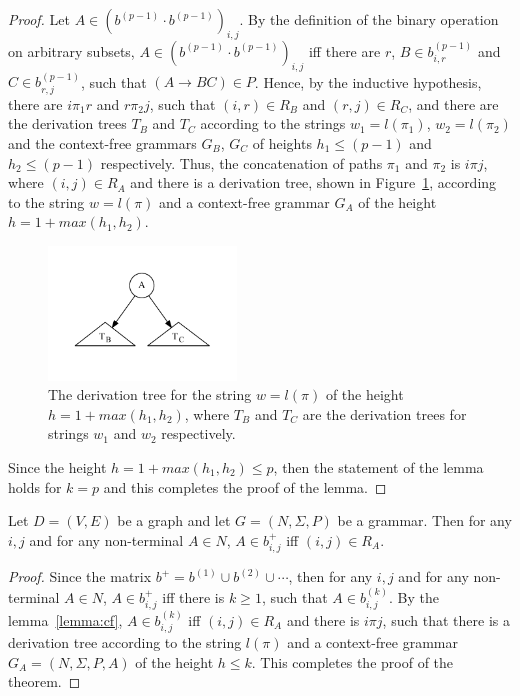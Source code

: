 \begin{proof}
Let $A \in (b^{(p-1)} \cdot b^{(p-1)})_{i,j}$. By the definition of the binary operation on arbitrary subsets, $A \in (b^{(p-1)} \cdot b^{(p-1)})_{i,j}$ iff there are $r$, $B \in b^{(p-1)}_{i,r}$ and $C \in b^{(p-1)}_{r,j}$, such that $(A \rightarrow B C) \in P$. Hence, by the inductive hypothesis, there are $i \pi_1 r$ and $r \pi_2 j$, such that $(i,r) \in R_B$ and $(r,j) \in R_C$, and there are the derivation trees $T_B$ and $T_C$ according to the strings $w_1 = l(\pi_1)$, $w_2 = l(\pi_2)$ and the context-free grammars $G_B$, $G_C$ of heights $h_1 \leq (p-1)$ and $h_2 \leq (p-1)$ respectively. Thus, the concatenation of paths $\pi_1$ and $\pi_2$ is $i \pi j$, where $(i,j) \in R_A$ and there is a derivation tree, shown in Figure~\ref{tree2}, according to the string $w = l(\pi)$ and a context-free grammar $G_A$ of the height $h = 1 + max(h_1, h_2)$.

\begin{figure}[h!]
 \centering
 \includegraphics[width=5cm]{pictures/tree2.pdf}
 \caption{The derivation tree for the string $w = l(\pi)$ of the height $h = 1 + max(h_1, h_2)$, where $T_B$ and $T_C$ are the derivation trees for strings $w_1$ and $w_2$ respectively.}
 \label{tree2}
\end{figure}

Since the height $h = 1 + max(h_1, h_2) \leq p$, then the statement of the lemma holds for $k = p$ and this completes the proof of the lemma.
\end{proof}

\begin{mytheorem}\label{thm:correct}
 Let $D = (V,E)$ be a graph and let $G =(N,\Sigma,P)$ be a grammar. Then for any $i, j$ and for any non-terminal $A \in N$, $A \in b^+_{i,j}$ iff $(i,j) \in R_A$.
\end{mytheorem}
\begin{proof}

Since the matrix $b^+ = b^{(1)} \cup b^{(2)} \cup \cdots$, then for any $i, j$ and for any non-terminal $A \in N$, $A \in b^+_{i,j}$ iff there is $k \geq 1$, such that $A \in b^{(k)}_{i,j}$. By the lemma~\ref{lemma:cf}, $A \in b^{(k)}_{i,j}$ iff $(i,j) \in R_A$ and there is $i \pi j$, such that there is a derivation tree according to the string $l(\pi)$ and a context-free grammar $G_A = (N,\Sigma,P,A)$ of the height $h \leq k$. This completes the proof of the theorem.
\end{proof}

